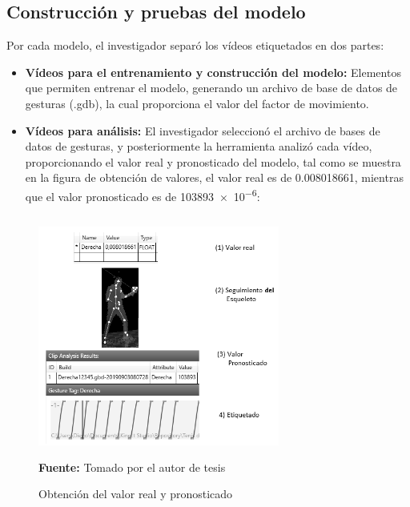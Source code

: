 \subsection{Construcci\'on y pruebas del modelo}
Por cada modelo, el investigador separ\'o los v\'ideos etiquetados en dos partes:
\begin{itemize}
\item \textbf{V\'ideos para el entrenamiento y construcci\'on del modelo:} Elementos que permiten  entrenar el modelo, generando un archivo de base de datos de gesturas (.gdb), la cual proporciona el valor del factor de movimiento.
\item \textbf{V\'ideos para an\'alisis:} El investigador seleccion\'o el archivo de bases de datos de gesturas, y posteriormente la herramienta analiz\'o cada v\'ideo, proporcionando el valor real y pronosticado del modelo, tal como se muestra en la figura de obtenci\'on de valores, el valor real es de 0.008018661, mientras que el valor pronosticado es de \num{103893e-6}:
\end{itemize}
 \begin{figure}[H]
	\caption{Obtenci\'on del valor real y pronosticado}
	\label{fig:getError}
	\centering
	\includegraphics[width=300px,height=300px]{graphics/getError.png} \\
	\textbf{Fuente:} Tomado por el autor de tesis
\end{figure} 
